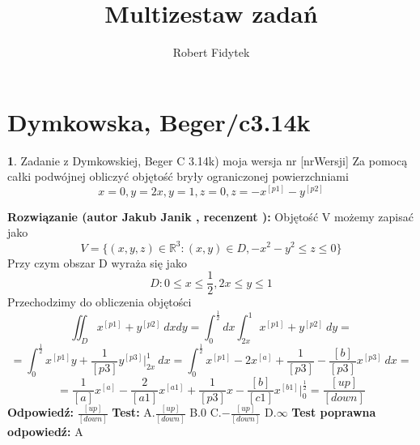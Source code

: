 \documentclass[12pt, a4paper]{article}
\title{Multizestaw zadań}
\author{Robert Fidytek}
\date{}
\theoremstyle{definition} %
\newtheorem{zad}{}
\newcommand{\kategoria}[1]{\section{#1}} %
\newcommand{\zadStart}[1]{\begin{zad}#1\newline} %
\newcommand{\zadStop}{\end{zad}}   %
\newcommand{\rozwStart}[2]{\noindent \textbf{Rozwiązanie (autor #1 , recenzent #2): }\newline} %
\newcommand{\rozwStop}{\newline}                                            %
\newcommand{\odpStart}{\noindent \textbf{Odpowiedź:}\newline}    %
\newcommand{\odpStop}{\newline}                                             %
\newcommand{\testStart}{\noindent \textbf{Test:}\newline} %
\newcommand{\testStop}{\newline} %
\newcommand{\kluczStart}{\noindent \textbf{Test poprawna odpowiedź:}\newline} %
\newcommand{\kluczStop}{\newline} %
\begin{document}
\maketitle


\kategoria{Dymkowska, Beger/c3.14k}
\zadStart{Zadanie z Dymkowskiej, Beger C 3.14k) moja wersja nr [nrWersji]}
Za pomocą całki podwójnej obliczyć objętość bryły ograniczonej powierzchniami $$x=0, y=2x, y=1, z=0, z=-x^{[p1]}-y^{[p2]}$$
\zadStop
\rozwStart{Jakub Janik}{}
Objętość V możemy zapisać jako
$$V=\{(x,y,z)\in\mathbb{R}^3\colon(x,y)\in D, -x^2-y^2 \leq z \leq 0\}$$
Przy czym obszar D wyraża się jako
$$D\colon 0 \leq x \leq \frac{1}{2}, 2x \leq y \leq 1$$
Przechodzimy do obliczenia objętości
$$\iint_D x^{[p1]}+y^{[p2]}\ dxdy=\int_0^{\frac{1}{2}}dx\int_{2x}^1 x^{[p1]}+y^{[p2]}\ dy=$$
$$=\int_0^{\frac{1}{2}}x^{[p1]}y+\frac{1}{[p3]}y^{[p3]}\Big|_{2x}^1\ dx=\int_0^{\frac{1}{2}}x^{[p1]}-2x^{[a]}+\frac{1}{[p3]}-\frac{[b]}{[p3]}x^{[p3]}\ dx=$$
$$=\frac{1}{[a]}x^{[a]}-\frac{2}{[a1]}x^{[a1]}+\frac{1}{[p3]}x-\frac{[b]}{[c1]}x^{[b1]}\Big|_0^{\frac{1}{2}}=\frac{[up]}{[down]}$$
\rozwStop
\odpStart
$\frac{[up]}{[down]}$
\odpStop
\testStart
A.$\frac{[up]}{[down]}$
B.$0$
C.$-\frac{[up]}{[down]}$
D.$\infty$
\testStop
\kluczStart
A
\kluczStop
\end{document}
